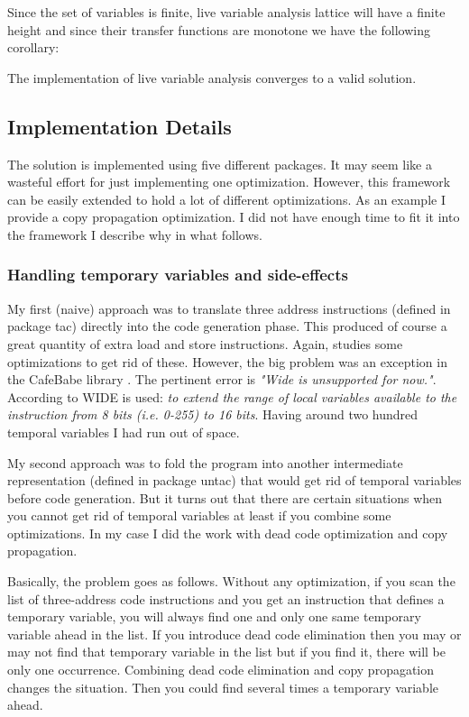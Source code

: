 Since the set of variables is finite, live variable analysis lattice will have a finite height and since their transfer functions are monotone we have the following corollary:

\begin{corollary}
The implementation of live variable analysis converges to a valid solution. 
\end{corollary}


\subsection{Implementation Details}

The solution is implemented using five different packages. It may seem like a wasteful effort for just implementing one optimization. However, this framework can be easily extended to hold a lot of different optimizations. As an example I provide a copy propagation optimization. I did not have enough time to fit it into the framework I describe why in what follows.

\subsubsection{Handling temporary variables and side-effects}

My first (naive) approach was to translate three address instructions (defined in package tac) directly into the code generation phase. This produced of course a great quantity of extra load and store instructions. Again, \cite{DragonBook} studies some optimizations to get rid of these. However, the big problem was an exception in the CafeBabe library \cite{CafeBabeError}. The pertinent error is \emph{"Wide is unsupported for now."}. According to \cite{WIDEinstr} WIDE is used: \emph{to extend the range of local variables available to the instruction from 8 bits (i.e. 0-255) to 16 bits}. Having around two hundred temporal variables I had run out of space. 

My second approach was to fold the program into another intermediate representation (defined in package untac) that would get rid of temporal variables before code generation. But it turns out that there are certain situations when you cannot get rid of temporal variables at least if you combine some optimizations. In my case I did the work with dead code optimization and copy propagation.

Basically, the problem goes as follows. Without any optimization, if you scan the list of three-address code instructions and you get an instruction that defines a temporary variable, you will always find one and only one same temporary variable ahead in the list. If you introduce dead code elimination then you may or may not find that temporary variable in the list but if you find it, there will be only one occurrence. Combining dead code elimination and copy propagation changes the situation. Then you could find several times a temporary variable ahead. 


